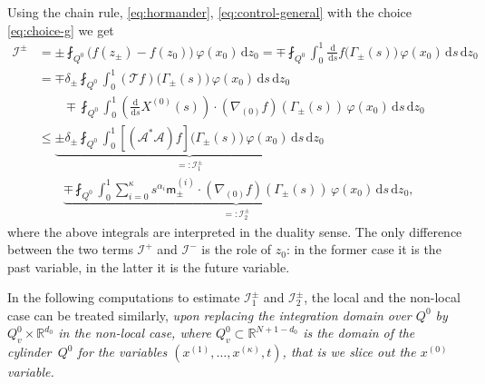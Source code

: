 \documentclass[10pt,a4paper]{amsart}
\theoremstyle{definition}
\newcommand\R{{\mathbb R}}
\newcommand{\cI}{{\mathcal I}}
\newcommand\ds{{\frac{\mathrm d}{\mathrm ds}}}
\newcommand{\dd}{{\, \mathrm d}}
\begin{document}
Using the chain rule, \eqref{eq:hormander},
\eqref{eq:control-general} with the choice \eqref{eq:choice-g} we
get
\begin{equation}
\label{eq:I1-I2}
\begin{aligned}
\cI^\pm & = \pm \fint_{Q^0} \Big(f(z_\pm) -
f(z_0)\Big) \, \varphi(x_0) \dd z_0  = \mp \fint_{Q^0} \int_0^1 \frac{\dd}{\dd
s}f\big(\Gamma_\pm(s)\big) \, \varphi(x_0)\dd s\dd z_0 \\
& = \mp\delta_\pm \fint_{Q^0} \int_0^1 \left(\mathcal T
f \right)\big(\Gamma_\pm(s)\big) \, \varphi(x_0)\dd s\dd z_0 \\
& \qquad \mp \fint_{Q^0} \int_0^1 \left(\ds X^{(0)}(s) \right)
\cdot \left(\nabla_{(0)} f\right)(\Gamma_\pm(s)) \, \varphi(x_0)\dd s \dd
z_0 \\
& \leq \underbrace{\pm\delta_\pm \fint_{Q^0} \int_0^1
\left[ \left(\mathcal A^* \mathcal A \right) f\right]
\big(\Gamma_\pm(s)\big) \, \varphi(x_0)\dd s\dd z_0}_{=:
\cI^\pm_1} \\
& \qquad \underbrace{\mp\fint_{Q^0} \int_0^1 \sum_{i =
0}^\kappa s^{\alpha_i} \mathsf m_\pm^{(i)}
\cdot \left(\nabla_{(0)} f \right)(\Gamma_\pm(s)) \,
\varphi(x_0)\dd s \dd z_0}_{=: \cI^\pm_2},
\end{aligned}
\end{equation}
where the above integrals are interpreted in the duality sense. The only difference between the two terms $\cI^+$ and
$\cI^-$ is the role of $z_0$: in the former case it is the past
variable, in the latter it is the future variable.

In the following computations to estimate $\mathcal I_1^\pm$ and $\mathcal I_2^\pm$,
the local and the non-local case can be treated similarly,
\textit{upon replacing the integration domain over $Q^0$
by \hbox{$Q^0_v \times \R^{d_0}$} in the non-local case,
where $Q^0_v \subset \R^{N + 1 - d_0}$ is the domain of the cylinder~$Q^0$
for the variables $(x^{(1)}, \dots, x^{(\kappa)}, t)$,
that is we slice out the $x^{(0)}$ variable.}
\end{document}
